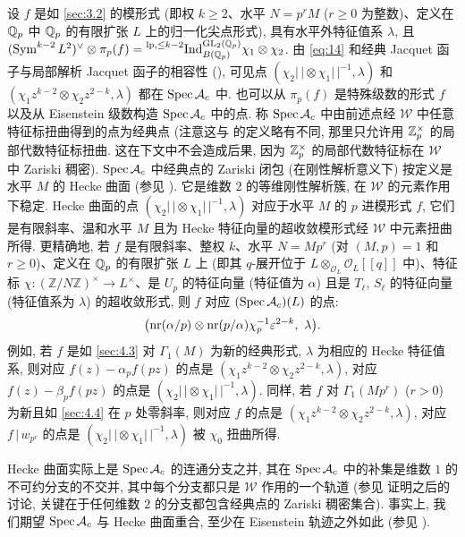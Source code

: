 设 $f$ 是如 \ref{sec:3.2} 的模形式 (即权 $k \ge 2$、水平 $N = p^{r}M$ ($r \ge 0$ 为整数)、定义在 $\mathbb{Q}_p$ 中 $\mathbb{Q}_p$ 的有限扩张 $L$ 上的归一化尖点形式), 具有水平外特征值系 $\lambda$, 且 $(\operatorname{Sym}^{k-2}L^{2})^{\vee} \otimes \pi_p(f) = \prescript{\mathrm{lp},\le k-2}{}{\mathrm{Ind}}_{B(\mathbb{Q}_p)}^{\mathrm{GL}_2(\mathbb{Q}_p)} \chi_1 \otimes \chi_2$.
由 \eqref{eq:14} 和经典 Jacquet 函子与局部解析 Jacquet 函子的相容性 (\cite[Prop.~4.3.6]{ref:22}), 可见点 $(\chi_2|\,| \otimes \chi_1|\,|^{-1},\lambda)$ 和 $(\chi_1z^{k-2} \otimes \chi_2z^{2-k},\lambda)$ 都在 $\operatorname{Spec} \mathcal{A}_c$ 中.
也可以从 $\pi_p(f)$ 是特殊级数的形式 $f$ 以及从 Eisenstein 级数构造 $\operatorname{Spec} \mathcal{A}_c$ 中的点.
称 $\operatorname{Spec} \mathcal{A}_c$ 中由前述点经 $\mathcal{W}$ 中任意特征标扭曲得到的点为经典点 (注意这与 \cite{ref:21} 的定义略有不同, 那里只允许用 $\mathbb{Z}_p^{\times}$ 的局部代数特征标扭曲.
这在下文中不会造成后果, 因为 $\mathbb{Z}_p^{\times}$ 的局部代数特征标在 $\mathcal{W}$ 中 Zariski 稠密).
$\operatorname{Spec} \mathcal{A}_c$ 中经典点的 Zariski 闭包 (在刚性解析意义下) 按定义是水平 $M$ 的 Hecke 曲面 (参见 \cite[Prop.~4.4.15]{ref:24}).
它是维数 $2$ 的等维刚性解析簇, 在 $\mathcal{W}$ 的元素作用下稳定.
Hecke 曲面的点 $(\chi_2|\,| \otimes \chi_1|\,|^{-1},\lambda)$ 对应于水平 $M$ 的 $p$ 进模形式 $f$, 它们是有限斜率、温和水平 $M$ 且为 Hecke 特征向量的超收敛模形式经 $\mathcal{W}$ 中元素扭曲所得.
更精确地, 若 $f$ 是有限斜率、整权 $k$、水平 $N = Mp^{r}$ (对 $(M,p) = 1$ 和 $r \ge 0$)、定义在 $\mathbb{Q}_p$ 的有限扩张 $L$ 上 (即其 $q$-展开位于 $L \otimes_{\mathcal{O}_L} \mathcal{O}_L[[q]]$ 中)、特征标 $\chi : (\mathbb{Z}/N\mathbb{Z})^{\times} \to L^{\times}$、是 $U_p$ 的特征向量 (特征值为 $\alpha$) 且是 $T_{\ell}$, $S_{\ell}$ 的特征向量 (特征值系为 $\lambda$) 的超收敛形式, 则 $f$ 对应 $(\operatorname{Spec} \mathcal{A}_c)(L)$ 的点:
\[
\bigl(\operatorname{nr}(\alpha/p) \otimes \operatorname{nr}(p/\alpha)\chi_p^{-1}\varepsilon^{2-k},\ \lambda\bigr).
\]
例如, 若 $f$ 是如 \ref{sec:4.3} 对 $\Gamma_1(M)$ 为新的经典形式, $\lambda$ 为相应的 Hecke 特征值系, 则对应 $f(z) - \alpha_p f(pz)$ 的点是 $(\chi_1z^{k-2} \otimes \chi_2z^{2-k},\lambda)$, 对应 $f(z) - \beta_p f(pz)$ 的点是 $(\chi_2|\,| \otimes \chi_1|\,|^{-1},\lambda)$.
同样, 若 $f$ 对 $\Gamma_1(Mp^{r})$ ($r > 0$) 为新且如 \ref{sec:4.4} 在 $p$ 处零斜率, 则对应 $f$ 的点是 $(\chi_1z^{k-2} \otimes \chi_2z^{2-k},\lambda)$, 对应 $f\,|\,w_{p^{r}}$ 的点是 $(\chi_2|\,| \otimes \chi_1|\,|^{-1},\lambda)$ 被 $\chi_0$ 扭曲所得.

Hecke 曲面实际上是 $\operatorname{Spec} \mathcal{A}_c$ 的连通分支之并, 其在 $\operatorname{Spec} \mathcal{A}_c$ 中的补集是维数 $1$ 的不可约分支的不交并, 其中每个分支都只是 $\mathcal{W}$ 作用的一个轨道 (参见 \cite[Prop.~4.4.14]{ref:24} 证明之后的讨论, 关键在于任何维数 $2$ 的分支都包含经典点的 Zariski 稠密集合).
事实上, 我们期望 $\operatorname{Spec} \mathcal{A}_c$ 与 Hecke 曲面重合, 至少在 Eisenstein 轨迹之外如此 (参见 \cite[Thm.~7.5.8]{ref:23}).

